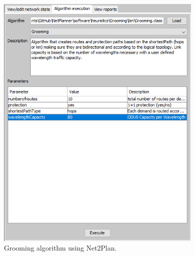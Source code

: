 \begin{figure}[h!]
\centering
\includegraphics[width=10cm]{sdf/heuristic/figures/grooming}
\caption{Grooming algorithm using Net2Plan.}
\label{grooming}
\end{figure} 